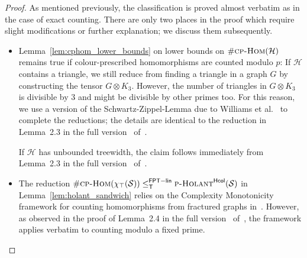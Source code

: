 \documentclass[authorcolumns,numberwithinsect]{no-lipics-v2022}
\newcommand{\homsupp}{\chi}
\newcommand{\cphomsprob}{\text{\sc{cp-Hom}}}
\newcommand{\fptlinred}{\leq^{\mathsf{FPT-lin}}_{\mathsf{T}}}
\newcommand{\holantprobstar}{\text{\sc{p-Holant}}^{\mathsf{Hcol}}}
\begin{document}
\begin{proof}
    As mentioned previously, the classification is proved almost verbatim as in the case of exact counting. There are only two places in the proof which require slight modifications or further explanation; we discuss them subsequently.
    \begin{itemize}
        \item Lemma~\ref{lem:cphom_lower_bounds} on lower bounds on $\#\textsc{cp-Hom}(\mathcal{H})$ remains true if colour-prescribed homomorphisms are counted modulo $p$: If $\mathcal{H}$ contains a triangle, we still reduce from finding a triangle in a graph $G$ by constructing the tensor $G\otimes K_3$. However, the number of triangles in $G\otimes K_3$ is divisible by $3$ and might be divisible by other primes too. For this reason, we use a version of the Schwartz-Zippel-Lemma due to Williams et al.\ \cite{WilliamsWWY15} to complete the reductions; the details are identical to the reduction in Lemma~2.3 in the full version~\cite{PeyerimhoffRSSVarxiv} of~\cite{PeyerimhoffRSV21}. 

        If $\mathcal{H}$ has unbounded treewidth, the claim follows immediately from Lemma~2.3 in the full version~\cite{PeyerimhoffRSSVarxiv} of~\cite{PeyerimhoffRSV21}. 
        \item The reduction $\#\cphomsprob(\homsupp_\top(\mathcal{S})) \fptlinred \holantprobstar(\mathcal{S})$ in Lemma~\ref{lem:holant_sandwich} relies on the Complexity Monotonicity framework for counting homomorphisms from fractured graphs in~\cite[Section 4.1]{PeyerimhoffRSSVW23}. However, as observed in the proof of Lemma~2.4 in the full version~\cite{PeyerimhoffRSSVarxiv} of~\cite{PeyerimhoffRSV21}, the framework applies verbatim to counting modulo a fixed prime.
    \end{itemize}
\end{proof}
\end{document}
